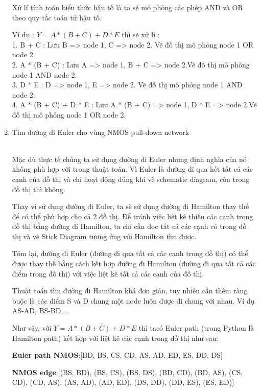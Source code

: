 \documentclass[a4paper,12pt]{article}
\begin{document}
\begin{enumerate}[label=\alph*.]
Xử lí tính toán biểu thức hậu tố là ta sẽ mô phỏng các phép AND và OR theo quy tắc toán tử hậu tố.

Ví dụ : \(Y = \overline{A *(B + C) + D * E}\) thì sẽ xử lí :\\
1. B + C : Lưu B => node 1, C => node 2. Vẽ đồ thị mô phỏng node 1 OR node 2.\\
2. A * (B + C) : Lưu A => node 1, B + C => node 2.Vẽ đồ thị mô phỏng node 1 AND node 2.\\
3. D * E : D => node 1, E => node 2. Vẽ đồ thị mô phỏng node 1 AND node 2.\\
4. A * (B + C) + D * E : Lưu A * (B + C) => node 1, D * E => node 2.Vẽ đồ thị mô phỏng node 1 OR node 2.
    \item{Tìm đường đi Euler cho vùng NMOS pull-down network}
    \\
Mặc dù thực tế chúng ta sử dụng đường đi Euler nhưng định nghĩa của nó không phù hợp với trong thuật toán.
Vì Euler là đường đi qua hết tất cả các cạnh của đồ thị và chỉ hoạt động đúng khi vẽ schematic diagram,
còn trong đồ thị thì không.

Thay vì sử dụng đường đi Euler, ta sẽ sử dụng đường đi Hamilton thay thế để có thể phù hợp cho cả 2 đồ thị.
Để tránh việc liệt kê thiếu các cạnh trong đồ thị bằng đường đi Hamilton, ta chỉ cần đọc tất cả các cạnh có trong đồ thị
và vẽ Stick Diagram tương ứng với Hamilton tìm được.

Tóm lại, đường đi Euler (đường đi qua tất cả các cạnh trong đồ thị) có thể được
thay thế bằng cách kết hợp đường đi Hamilton (đường đi qua tất cả các điểm trong đồ thị) với việc liệt kê 
tất cả các cạnh của đồ thị.

Thuật toán tìm đường đi Hamilton khá đơn giản, tuy nhiên cần thêm ràng buộc 
là các điểm S và D chung một node luôn được đi chung với nhau. Ví dụ AS-AD, BS-BD,...

Như vậy, với \( Y = \overline{A * (B + C) + D * E} \) thì tacó Euler path (trong Python là Hamilton path)
kết hợp với liệt kê các cạnh trong đồ thị như sau:

\textbf{Euler path NMOS}:[BD, BS, CS, CD, AS, AD, ED, ES, DD, DS]

\textbf{NMOS edge}:[(BS, BD), (BS, CS), (BS, DS), (BD, CD), (BD, AS), (CS, CD),
(CD, AS), (AS, AD), (AD, ED), (DS, DD), (DD, ES), (ES, ED)]
\end{enumerate}
\end{document}
